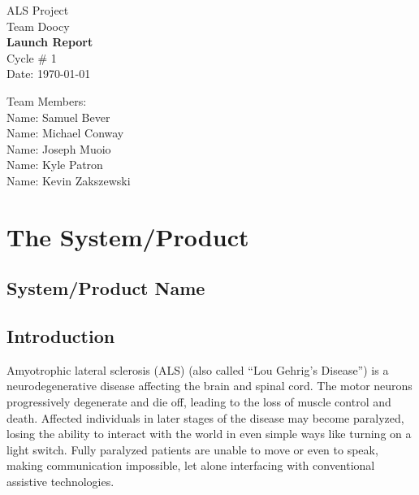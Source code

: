 \documentclass{report}
\begin{document}
\begin{titlepage}
    \begin{center}
        \begin{huge}
        ALS Project \\[1cm]
        Team Doocy \\[2.2cm]
        { \bfseries Launch Report } \\[1cm]
        Cycle \# 1\\[2.2cm]
        Date: \required\today\\[1cm]
        \end{huge}
    \end{center}
    \null \vfill
    \begin{large}
        Team Members: \\[0.5cm]
        Name: Samuel Bever\\[0.5cm]
        Name: Michael Conway\\[0.5cm]
        Name: Joseph Muoio\\[0.5cm]
        Name: Kyle Patron\\[0.5cm]
        Name: Kevin Zakszewski
    \end{large}
\end{titlepage}

\section*{\centering The System/Product}

\subsection*{System/Product Name}


\subsection*{Introduction}

Amyotrophic lateral sclerosis (ALS) (also called ``Lou Gehrig's Disease'') is
a neurodegenerative disease affecting the brain and spinal cord. The motor
neurons progressively degenerate and die off, leading to the loss of muscle
control and death. Affected individuals in later stages of the disease may
become paralyzed, losing the ability to interact with the world in even simple
ways like turning on a light switch. Fully paralyzed patients are unable to
move or even to speak, making communication impossible, let alone interfacing
with conventional assistive technologies.\cite{ALSsource}
\end{document}
